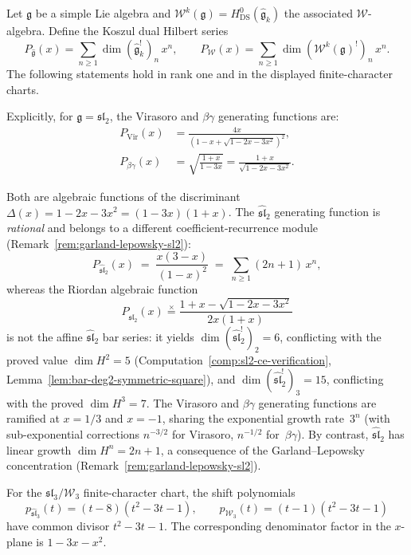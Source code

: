 \begin{theorem}
\label{thm:ds-bar-gf-discriminant}
Let $\mathfrak{g}$ be a simple Lie algebra and
$\mathcal{W}^k(\mathfrak{g}) = H^0_{\mathrm{DS}}(\widehat{\mathfrak{g}}_k)$
the associated $\mathcal{W}$-algebra.
Define the Koszul dual Hilbert series
\[
P_{\widehat{\mathfrak{g}}}(x)
 = \sum_{n \geq 1} \dim (\widehat{\mathfrak{g}}_k^!)_n\, x^n,
\qquad
P_{\mathcal{W}}(x)
 = \sum_{n \geq 1} \dim (\mathcal{W}^k(\mathfrak{g})^!)_n\, x^n.
\]
The following statements hold in rank one and in the displayed
finite-character charts.

Explicitly, for $\mathfrak{g} = \mathfrak{sl}_2$,
the Virasoro and $\beta\gamma$ generating functions are:
\begin{align}
P_{\mathrm{Vir}}(x)
 &= \frac{4x}{(1 - x + \sqrt{1 - 2x - 3x^2})^2},
 \label{eq:gf-vir-motzkin} \\
P_{\beta\gamma}(x)
 &= \sqrt{\frac{1+x}{1-3x}}
 = \frac{1+x}{\sqrt{1-2x-3x^2}}.
 \label{eq:gf-betagamma}
\end{align}

Both are algebraic functions of the discriminant
$\Delta(x) = 1 - 2x - 3x^2 = (1-3x)(1+x)$.
The $\widehat{\mathfrak{sl}}_2$ generating function is
\emph{rational} and belongs to a different coefficient-recurrence
module (Remark~\ref{rem:garland-lepowsky-sl2}):
\begin{equation}\label{eq:gf-sl2-rational}
P_{\widehat{\mathfrak{sl}}_2}(x)
 \;=\; \frac{x(3-x)}{(1-x)^2}
 \;=\; \sum_{n \geq 1}(2n+1)\,x^n,
\end{equation}
whereas the Riordan algebraic function
\begin{equation}\label{eq:gf-sl2-riordan}
P_{\widehat{\mathfrak{sl}}_2}(x)
 \stackrel{\times}{=} \frac{1 + x - \sqrt{1 - 2x - 3x^2}}{2x(1+x)}
\end{equation}
is not the affine $\widehat{\mathfrak{sl}}_2$ bar series: it yields
$\dim(\widehat{\mathfrak{sl}}_2^!)_2 = 6$, conflicting
with the proved value $\dim H^2 = 5$
(Computation~\ref{comp:sl2-ce-verification},
Lemma~\ref{lem:bar-deg2-symmetric-square}),
and $\dim(\widehat{\mathfrak{sl}}_2^!)_3 = 15$, conflicting with
the proved $\dim H^3 = 7$.
The Virasoro and $\beta\gamma$ generating functions are ramified at
$x = 1/3$ and $x = -1$, sharing the
exponential growth rate~$3^n$
(with sub-exponential corrections $n^{-3/2}$ for
Virasoro, $n^{-1/2}$ for~$\beta\gamma$).
By contrast, $\widehat{\mathfrak{sl}}_2$ has linear growth
$\dim H^n = 2n + 1$, a consequence of the
Garland--Lepowsky concentration
(Remark~\ref{rem:garland-lepowsky-sl2}).

For the $\mathfrak{sl}_3/\mathcal{W}_3$ finite-character chart, the
shift polynomials
\[
p_{\widehat{\mathfrak{sl}}_3}(t)=(t-8)(t^2-3t-1),\qquad
p_{\mathcal{W}_3}(t)=(t-1)(t^2-3t-1)
\]
have common divisor $t^2-3t-1$.  The corresponding denominator
factor in the $x$-plane is $1-3x-x^2$.
\end{theorem}

